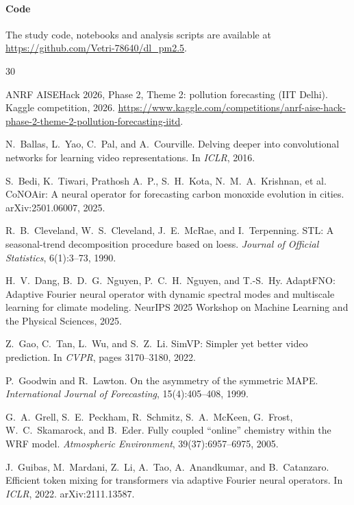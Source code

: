 \documentclass[10pt]{article}
\begin{document}
\paragraph{Code} The study code, notebooks and analysis scripts are available at \url{https://github.com/Vetri-78640/dl_pm2.5}.

\small
\begin{thebibliography}{30}\setlength{\itemsep}{1pt}

 ANRF AISEHack 2026, Phase 2, Theme 2: pollution forecasting (IIT Delhi). Kaggle competition, 2026. \url{https://www.kaggle.com/competitions/anrf-aise-hack-phase-2-theme-2-pollution-forecasting-iitd}.

 N.~Ballas, L.~Yao, C.~Pal, and A.~Courville. Delving deeper into convolutional networks for learning video representations. In \emph{ICLR}, 2016.

 S.~Bedi, K.~Tiwari, Prathosh A.~P., S.~H.~Kota, N.~M.~A.~Krishnan, et al. CoNOAir: A neural operator for forecasting carbon monoxide evolution in cities. arXiv:2501.06007, 2025.

 R.~B.~Cleveland, W.~S.~Cleveland, J.~E.~McRae, and I.~Terpenning. STL: A seasonal-trend decomposition procedure based on loess. \emph{Journal of Official Statistics}, 6(1):3--73, 1990.

 H.~V.~Dang, B.~D.~G.~Nguyen, P.~C.~H.~Nguyen, and T.-S.~Hy. AdaptFNO: Adaptive Fourier neural operator with dynamic spectral modes and multiscale learning for climate modeling. NeurIPS 2025 Workshop on Machine Learning and the Physical Sciences, 2025.

 Z.~Gao, C.~Tan, L.~Wu, and S.~Z.~Li. SimVP: Simpler yet better video prediction. In \emph{CVPR}, pages 3170--3180, 2022.

 P.~Goodwin and R.~Lawton. On the asymmetry of the symmetric MAPE. \emph{International Journal of Forecasting}, 15(4):405--408, 1999.

 G.~A.~Grell, S.~E.~Peckham, R.~Schmitz, S.~A.~McKeen, G.~Frost, W.~C.~Skamarock, and B.~Eder. Fully coupled ``online'' chemistry within the WRF model. \emph{Atmospheric Environment}, 39(37):6957--6975, 2005.

 J.~Guibas, M.~Mardani, Z.~Li, A.~Tao, A.~Anandkumar, and B.~Catanzaro. Efficient token mixing for transformers via adaptive Fourier neural operators. In \emph{ICLR}, 2022. arXiv:2111.13587.


\end{thebibliography}
\end{document}
